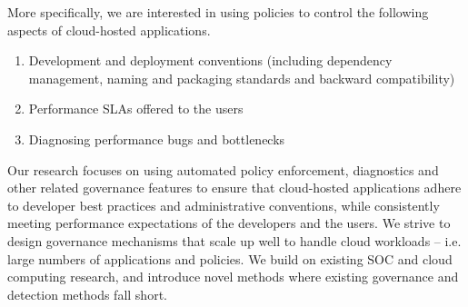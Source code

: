 More specifically, we are interested in using policies to control the following aspects of cloud-hosted 
applications.
\begin{enumerate}
\item Development and deployment conventions (including dependency management, naming and packaging
standards and backward compatibility)
\item Performance SLAs offered to the users
\item Diagnosing performance bugs and bottlenecks
\end{enumerate}

Our research focuses on using automated policy enforcement, diagnostics and other related 
governance features to ensure that
cloud-hosted applications adhere to developer best practices and administrative conventions, while
consistently meeting performance expectations of the developers and the users. We strive to design
governance mechanisms that scale up well to handle cloud workloads -- i.e. large numbers of applications
and policies. We build on existing SOC and cloud computing research, and introduce novel methods
where existing governance and detection methods fall short. 